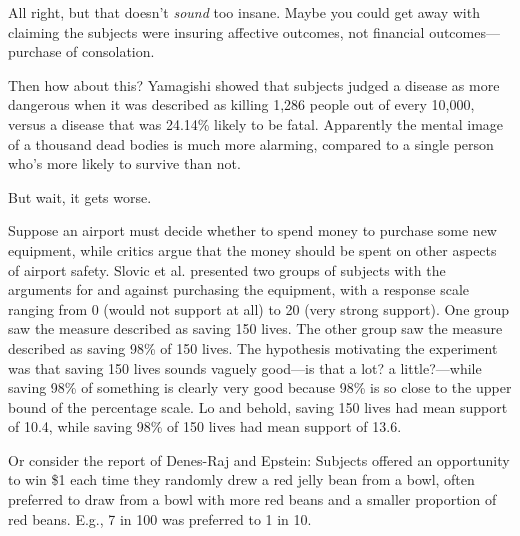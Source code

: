 {
 All right, but that doesn't \textit{sound} too
insane. Maybe you could get away with claiming the subjects were
insuring affective outcomes, not financial outcomes---purchase of
consolation.}

{
 Then how about this? Yamagishi showed that subjects judged a
disease as more dangerous when it was described as killing 1,286 people
out of every 10,000, versus a disease that was 24.14\% likely to be
fatal. Apparently the mental image of a thousand
dead bodies is much more alarming, compared to a single person
who's more likely to survive than not.}

{
 But wait, it gets worse.}

{
 Suppose an airport must decide whether to spend money to purchase
some new equipment, while critics argue that the money should be spent
on other aspects of airport safety. Slovic et al. presented two groups
of subjects with the arguments for and against purchasing the
equipment, with a response scale ranging from 0 (would not support at
all) to 20 (very strong support). One group saw the
measure described as saving 150 lives. The other group saw the measure
described as saving 98\% of 150 lives. The hypothesis motivating the
experiment was that saving 150 lives sounds vaguely good---is that a
lot? a little?---while saving 98\% of something is clearly very good
because 98\% is so close to the upper bound of the percentage scale. Lo
and behold, saving 150 lives had mean support of 10.4, while saving
98\% of 150 lives had mean support of 13.6.}

{
 Or consider the report of Denes-Raj and
Epstein: Subjects offered an opportunity to win \$1
each time they randomly drew a red jelly bean from a bowl, often
preferred to draw from a bowl with more red beans and a smaller
proportion of red beans. E.g., 7 in 100 was preferred to 1 in 10.}

